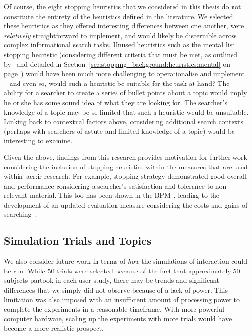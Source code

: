 Of course, the eight stopping heuristics that we considered in this thesis do not constitute the entirety of the heuristics defined in the literature. We selected these heuristics as they offered interesting differences between one another, were \emph{relatively} straightforward to implement, and would likely be discernible across complex informational search tasks. Unused heuristics such as the mental list stopping heuristic (considering different criteria that must be met, as outlined by~\cite{nickles1995judgment} and detailed in Section~\ref{sec:stopping_background:heuristics:mental} on page~\pageref{sec:stopping_background:heuristics:mental}) would have been much more challenging to operationalise and implement -- and even so, would such a heuristic be suitable for the task at hand? The ability for a searcher to create a series of bullet points about a topic would imply he or she has some sound idea of what they are looking for. The searcher's knowledge of a topic may be so limited that such a heuristic would be unsuitable. Linking back to contextual factors above, considering additional search contexts (perhaps with searchers of astute and limited knowledge of a topic) would be interesting to examine.

Given the above, findings from this research provides motivation for further work considering the inclusion of stopping heuristics within the measures that are used within~\gls{acr:ir} research. For example, stopping strategy  demonstrated good overall and performance considering a searcher's satisfaction and tolerance to non-relevant material. This too has been shown in the BPM~\citep{zhang2017bejewled}, leading to the development of an updated evaluation measure considering the costs and gains of searching~\citep{azzopardi2018cwl}.

\subsection{Simulation Trials and Topics}\label{sec:conclusions:future:running}
We also consider future work in terms of \emph{how} the simulations of interaction could be run. While 50 trials were selected because of the fact that approximately 50 subjects partook in each user study, there may be trends and significant differences that we simply did not observe because of a lack of power. This limitation was also imposed with an insufficient amount of processing power to complete the experiments in a reasonable timeframe. With more powerful computer hardware, scaling up the experiments with more trials would have become a more realistic prospect.

